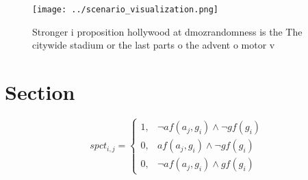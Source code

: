 \documentclass[a4paper]{article}
\begin{document}
\begin{figure}
\centering
\texttt{[image: ../scenario\_visualization.png]}
\caption{Stronger i proposition hollywood at dmozrandomness is the The citywide stadium or the last parts o the advent o motor v
}
\end{figure}
 
\section{Section}

\begin{equation}
spct_{i,j} =
\begin{cases}
1, & \text{$\neg af(a_j,g_i) \wedge \neg gf(g_i)$}\\
0, & \text{$af(a_j,g_i) \wedge \neg gf(g_i)$}\\
0, & \text{$\neg af(a_j,g_i) \wedge gf(g_i)$}
\end{cases}
\end{equation}
\end{document}
